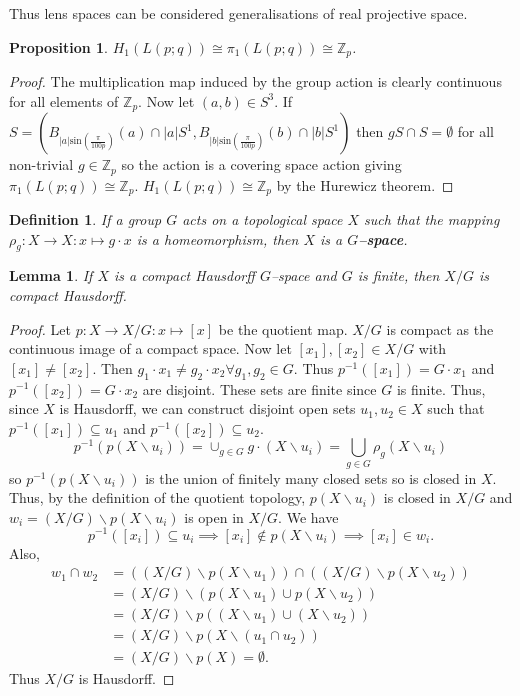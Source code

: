 \documentclass{article}
\newtheorem{definition}[theorem]{Definition}
\newtheorem{lemma}[theorem]{Lemma}
\newtheorem{proposition}[theorem]{Proposition}
\begin{document}
\noindent Thus lens spaces can be considered generalisations of real projective space.

\begin{proposition}
$H_1(L(p;q))\cong\pi_1(L(p;q))\cong \mathbb{Z}_p$.
\end{proposition}
\begin{proof}
The multiplication map induced by the group action is clearly continuous for all elements of $\mathbb{Z}_p$.
Now let $(a,b)\in S^3$. If $S=(B_{|a|\text{sin}(\frac{\pi}{100p})}(a)\cap |a|S^1,B_{|b|\text{sin}(\frac{\pi}{100p})}(b)\cap |b|S^1)$ then $gS\cap S=\emptyset$ for all non-trivial $g\in \mathbb{Z}_p$ so the action is a covering space action giving $\pi_1(L(p;q))\cong \mathbb{Z}_p$. $H_1(L(p;q))\cong \mathbb{Z}_p$ by the Hurewicz theorem.
\end{proof}

\begin{definition}
If a group $G$ acts on a topological space $X$ such that the mapping $\rho_g:X\to X\colon x\mapsto g\cdot x$ is a homeomorphism, then $X$ is a \textbf{$G$--space}.
\end{definition}

\begin{lemma}
If $X$ is a compact Hausdorff $G$--space and $G$ is finite, then $X/G$ is compact Hausdorff.
\end{lemma}
\begin{proof}
Let $p:X\to X/G\colon x\mapsto[x]$ be the quotient map. $X/G$ is compact as the continuous image of a compact space. Now let $[x_1],[x_2]\in X/G$ with $[x_1]\neq [x_2]$. Then $g_1\cdot x_1\neq g_2\cdot x_2\forall g_1,g_2\in G$. Thus $p^{-1}([x_1])=G\cdot x_1$ and $p^{-1}([x_2])=G\cdot x_2$ are disjoint. These sets are finite since $G$ is finite. Thus, since $X$ is Hausdorff, we can construct disjoint open sets $u_1,u_2\in X$ such that $p^{-1}([x_1])\subseteq u_1$ and $p^{-1}([x_2])\subseteq u_2$. \[p^{-1}(p(X\backslash u_i))=\cup_{g\in G}g\cdot(X\backslash u_i)=\bigcup_{g\in G}\rho_g(X\backslash u_i)\] so $p^{-1}(p(X\backslash u_i))$ is the union of finitely many closed sets so is closed in $X$. Thus, by the definition of the quotient topology, $p(X\backslash u_i)$ is closed in $X/G$ and $w_i=(X/G)\backslash p(X\backslash u_i)$ is open in $X/G$. We have \[p^{-1}([x_i])\subseteq u_i\implies [x_i]\notin p(X\backslash u_i)\implies[x_i]\in w_i.\] Also, \begin{align*}w_1\cap w_2&=((X/G)\backslash p(X\backslash u_1))\cap((X/G)\backslash p(X\backslash u_2))\\&=(X/G)\backslash(p(X\backslash u_1)\cup p(X\backslash u_2))\\&=(X/G)\backslash p((X\backslash u_1)\cup (X\backslash u_2))\\&=(X/G)\backslash p(X\backslash(u_1\cap u_2))\\&=(X/G)\backslash p(X)=\emptyset.\end{align*} Thus $X/G$ is Hausdorff.
\end{proof}
\end{document}
